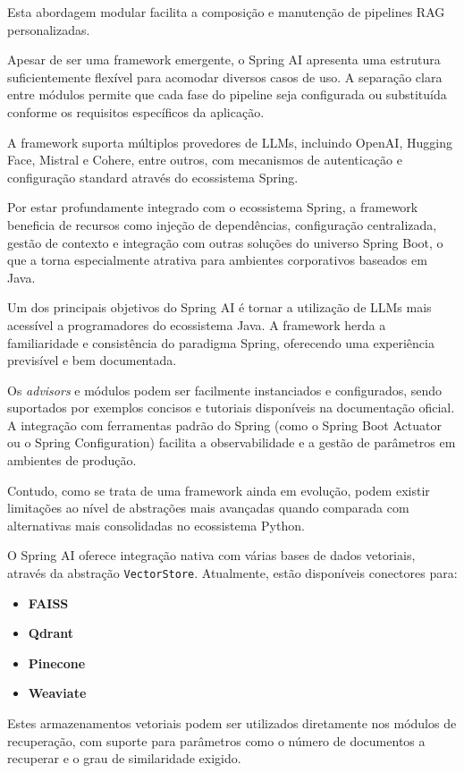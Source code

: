 Esta abordagem modular facilita a composição e manutenção de pipelines RAG personalizadas.


Apesar de ser uma framework emergente, o Spring AI apresenta uma estrutura suficientemente flexível para acomodar diversos casos de uso. A separação clara entre módulos permite que cada fase do pipeline seja configurada ou substituída conforme os requisitos específicos da aplicação.

A framework suporta múltiplos provedores de LLMs, incluindo OpenAI, Hugging Face, Mistral e Cohere, entre outros, com mecanismos de autenticação e configuração standard através do ecossistema Spring.

Por estar profundamente integrado com o ecossistema Spring, a framework beneficia de recursos como injeção de dependências, configuração centralizada, gestão de contexto e integração com outras soluções do universo Spring Boot, o que a torna especialmente atrativa para ambientes corporativos baseados em Java.


Um dos principais objetivos do Spring AI é tornar a utilização de LLMs mais acessível a programadores do ecossistema Java. A framework herda a familiaridade e consistência do paradigma Spring, oferecendo uma experiência previsível e bem documentada.

Os \textit{advisors} e módulos podem ser facilmente instanciados e configurados, sendo suportados por exemplos concisos e tutoriais disponíveis na documentação oficial. A integração com ferramentas padrão do Spring (como o Spring Boot Actuator ou o Spring Configuration) facilita a observabilidade e a gestão de parâmetros em ambientes de produção.

Contudo, como se trata de uma framework ainda em evolução, podem existir limitações ao nível de abstrações mais avançadas quando comparada com alternativas mais consolidadas no ecossistema Python.


O Spring AI oferece integração nativa com várias bases de dados vetoriais, através da abstração \texttt{VectorStore}. Atualmente, estão disponíveis conectores para:

\begin{itemize} \item \textbf{FAISS} \item \textbf{Qdrant} \item \textbf{Pinecone} \item \textbf{Weaviate} \end{itemize}

Estes armazenamentos vetoriais podem ser utilizados diretamente nos módulos de recuperação, com suporte para parâmetros como o número de documentos a recuperar e o grau de similaridade exigido.

